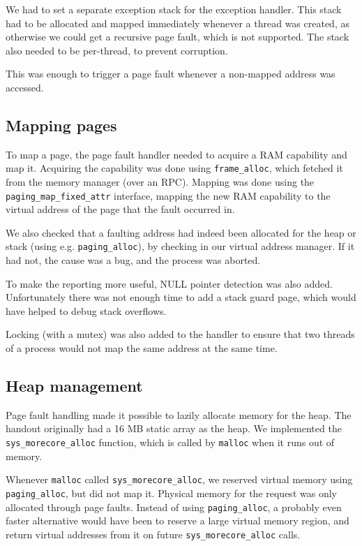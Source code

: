 We had to set a separate exception stack for the exception handler.
This stack had to be allocated and mapped immediately whenever a thread was created, as otherwise we could get a recursive page fault, which is not supported.
The stack also needed to be per-thread, to prevent corruption.

This was enough to trigger a page fault whenever a non-mapped address was accessed.

\subsection{Mapping pages}

To map a page, the page fault handler needed to acquire a RAM capability and map it.
Acquiring the capability was done using \verb|frame_alloc|, which fetched it from the memory manager (over an RPC).
Mapping was done using the \verb|paging_map_fixed_attr| interface, mapping the new RAM capability to the virtual address of the page that the fault occurred in.

We also checked that a faulting address had indeed been allocated for the heap or stack (using e.g. \verb|paging_alloc|), by checking in our virtual address manager.
If it had not, the cause was a bug, and the process was aborted.

To make the reporting more useful, NULL pointer detection was also added.
Unfortunately there was not enough time to add a stack guard page, which would have helped to debug stack overflows.

Locking (with a mutex) was also added to the handler to ensure that two threads of a process would not map the same address at the same time.


\subsection{Heap management}

Page fault handling made it possible to lazily allocate memory for the heap.
The handout originally had a 16 MB static array as the heap.
We implemented the \verb|sys_morecore_alloc| function, which is called by \verb|malloc| when it runs out of memory.

Whenever \verb|malloc| called \verb|sys_morecore_alloc|, we reserved virtual memory using \verb|paging_alloc|, but did not map it.
Physical memory for the request was only allocated through page faults.
Instead of using \verb|paging_alloc|, a probably even faster alternative would have been to reserve a large virtual memory region, and return virtual addresses from it on future \newline \verb|sys_morecore_alloc| calls.


